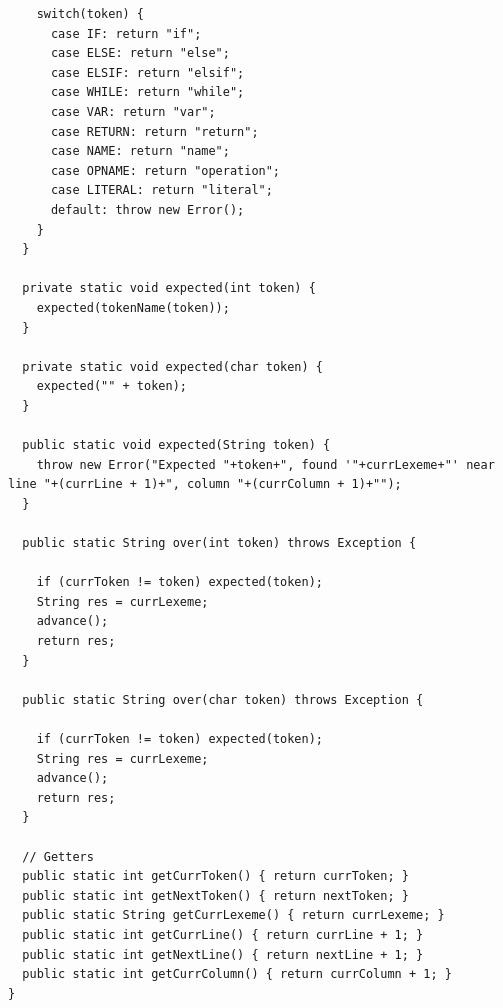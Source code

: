 \documentclass{homework}
\begin{document}
\begin{answer}
\begin{verbatim}
    switch(token) {
      case IF: return "if";
      case ELSE: return "else";
      case ELSIF: return "elsif";
      case WHILE: return "while";
      case VAR: return "var";
      case RETURN: return "return";
      case NAME: return "name";
      case OPNAME: return "operation";
      case LITERAL: return "literal";
      default: throw new Error();
    }
  }

  private static void expected(int token) {
    expected(tokenName(token));
  }

  private static void expected(char token) {
    expected("" + token);
  }

  public static void expected(String token) {
    throw new Error("Expected "+token+", found '"+currLexeme+"' near line "+(currLine + 1)+", column "+(currColumn + 1)+"");
  }

  public static String over(int token) throws Exception {

    if (currToken != token) expected(token);
    String res = currLexeme;
    advance();
    return res;
  }

  public static String over(char token) throws Exception {

    if (currToken != token) expected(token);
    String res = currLexeme;
    advance();
    return res;
  }

  // Getters
  public static int getCurrToken() { return currToken; }
  public static int getNextToken() { return nextToken; }
  public static String getCurrLexeme() { return currLexeme; }
  public static int getCurrLine() { return currLine + 1; }
  public static int getNextLine() { return nextLine + 1; }
  public static int getCurrColumn() { return currColumn + 1; }
}
  \end{verbatim}
\end{answer}
\end{document}
